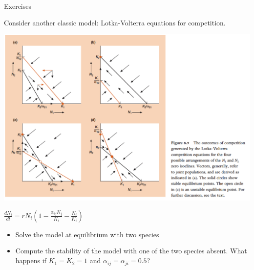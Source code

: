 \documentclass{eecslides}
\begin{document}
	\begin{frame}{Exercises}
		
		Consider another classic model: Lotka-Volterra equations for competition.

		\begin{center}
			\includegraphics[height=0.5\textheight]{lv_compet.png}
		\end{center}
		
		$ \frac{dN_i}{dt} = rN_i(1-\frac{\alpha_{ij}N_j}{K_i} -\frac{N_i}{K_i} )$

		\begin{itemize}
			\item Solve the model at equilibrium with two species
			\item Compute the stability of the model with one of the two species absent. What happens if $K_1 = K_2 = 1$ and $\alpha_{ij} = \alpha_{ji} = 0.5$?
		\end{itemize}

	\end{frame}

\end{document}
